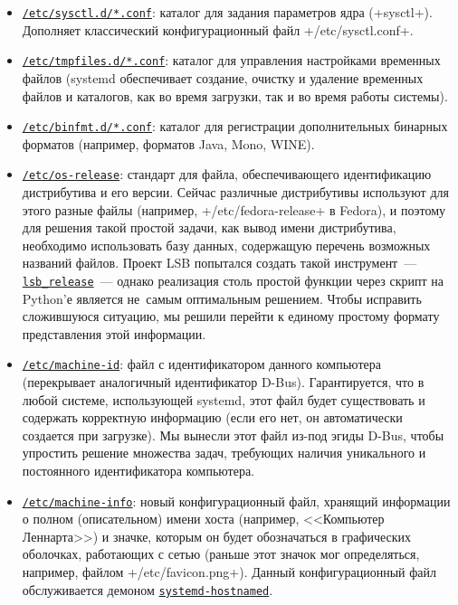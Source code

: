 \documentclass[10pt,oneside,a4paper]{article}
\newcommand{\hreftt}[2]{\href{#1}{\texttt{#2}}}
\begin{document}
\begin{itemize}
	\item
		\hreftt{http://www.freedesktop.org/software/systemd/man/sysctl.d.html}%
		{/etc/sysctl.d/*.conf}:
		каталог для задания параметров ядра (+sysctl+). Дополняет
		классический конфигурационный файл +/etc/sysctl.conf+.
	\item
		\hreftt{http://www.freedesktop.org/software/systemd/man/tmpfiles.d.html}%
		{/etc/tmpfiles.d/*.conf}:
		каталог для управления настройками временных файлов (systemd
		обеспечивает создание, очистку и удаление временных файлов и
		каталогов, как во время загрузки, так и во время работы
		системы).
	\item
		\hreftt{http://www.freedesktop.org/software/systemd/man/binfmt.d.html}%
		{/etc/binfmt.d/*.conf}:
		каталог для регистрации дополнительных бинарных форматов
		(например, форматов Java, Mono, WINE).
	\item
		\hreftt{http://www.freedesktop.org/software/systemd/man/os-release.html}%
		{/etc/os-release}:
		стандарт для файла, обеспечивающего идентификацию дистрибутива и
		его версии. Сейчас различные дистрибутивы используют для этого
		разные файлы (например, +/etc/fedora-release+ в Fedora), и
		поэтому для решения такой простой задачи, как вывод имени
		дистрибутива, необходимо использовать базу данных, содержащую
		перечень возможных названий файлов. Проект LSB попытался создать
		такой инструмент~---
		\hreftt{http://refspecs.freestandards.org/LSB_3.1.0/LSB-Core-generic/LSB-Core-generic/lsbrelease.html}{lsb\_release}~---
		однако реализация столь простой функции через скрипт на Python'е
		является не~самым оптимальным решением. Чтобы исправить
		сложившуюся ситуацию, мы решили перейти к единому простому
		формату представления этой информации.
	\item
		\hreftt{http://www.freedesktop.org/software/systemd/man/machine-id.html}%
		{/etc/machine-id}:
		файл с идентификатором данного компьютера (перекрывает
		аналогичный идентификатор D-Bus). Гарантируется, что в любой
		системе, использующей systemd, этот файл будет существовать и
		содержать корректную информацию (если его нет, он автоматически
		создается при загрузке). Мы вынесли этот файл из-под эгиды
		D-Bus, чтобы упростить решение множества задач, требующих
		наличия уникального и постоянного идентификатора компьютера.
	\item
		\hreftt{http://www.freedesktop.org/software/systemd/man/machine-info.html}%
		{/etc/machine-info}:
		новый конфигурационный файл, хранящий информации о полном 
		(описательном) имени хоста (например, <<Компьютер Леннарта>>) и
		значке, которым он будет обозначаться в графических оболочках,
		работающих с сетью (раньше этот значок мог определяться,
		например, файлом +/etc/favicon.png+). Данный конфигурационный
		файл обслуживается демоном
		\hreftt{http://www.freedesktop.org/wiki/Software/systemd/hostnamed}{systemd-hostnamed}.
\end{itemize}
\end{document}

